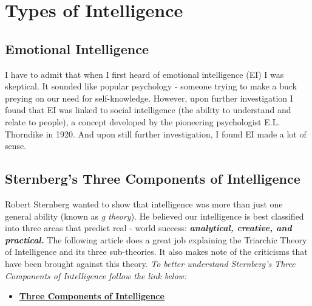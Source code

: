 \documentclass[
]{book}
\providecommand{\tightlist}{%
  \setlength{\itemsep}{0pt}\setlength{\parskip}{0pt}}
\begin{document}
\hypertarget{types-of-intelligence}{%
\section*{Types of Intelligence}\label{types-of-intelligence}}

\hypertarget{emotional-intelligence}{%
\subsection*{Emotional Intelligence}\label{emotional-intelligence}}

I have to admit that when I first heard of emotional intelligence (EI) I was skeptical. It sounded like popular psychology - someone trying to make a buck preying on our need for self-knowledge. However, upon further investigation I found that EI was linked to social intelligence (the ability to understand and relate to people), a concept developed by the pioneering psychologist E.L. Thorndike in 1920. And upon still further investigation, I found EI made a lot of sense.

\hypertarget{sternbergs-three-components-of-intelligence}{%
\subsection*{Sternberg's Three Components of Intelligence}\label{sternbergs-three-components-of-intelligence}}

Robert Sternberg wanted to show that intelligence was more than just one general ability (known as \emph{g theory}). He believed our intelligence is best classified into three areas that predict real - world success: \textbf{\emph{analytical, creative, and practical.}} The following article does a great job explaining the Triarchic Theory of Intelligence and its three sub-theories. It also makes note of the criticisms that have been brought against this theory. \emph{To better understand Sternberg's Three Components of Intelligence follow the link below:}

\begin{itemize}
\tightlist
\item
  \href{https://www.thoughtco.com/triarchic-theory-of-intelligence-4172497}{\textbf{Three Components of Intelligence}}
\end{itemize}
\end{document}
